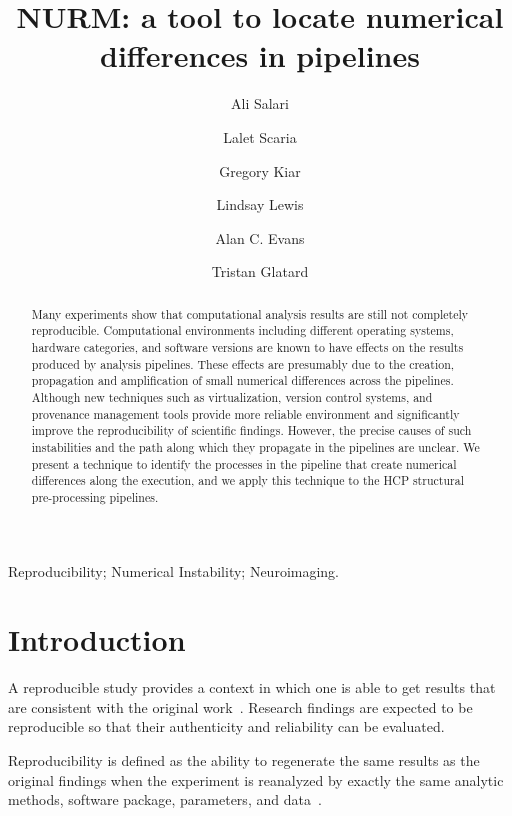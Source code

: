 \documentclass[a4paper,num-refs]{oup-contemporary}
\title{NURM: a tool to 
locate numerical differences in pipelines}
\begin{document}
\author[1]{Ali Salari}
\author[1]{Lalet Scaria}
\author[2,3]{Gregory Kiar}
\author[2]{Lindsay Lewis}
\author[2,3]{Alan C. Evans}
\author[1]{Tristan Glatard}


\maketitle

\begin{abstract} 

Many experiments show that computational analysis results are still not 
completely reproducible. Computational environments including different 
operating systems, hardware categories, and software versions are known 
to have effects on the results produced by analysis pipelines. These 
effects are presumably due to the creation, propagation and 
amplification of small numerical differences across the pipelines. 
Although new techniques such as virtualization, version control 
systems, and provenance management tools provide more reliable 
environment and significantly improve the reproducibility of scientific 
findings. However, the precise causes of such instabilities and the 
path along which they propagate in the pipelines are unclear.  We 
present a technique to identify the processes in the pipeline that 
create numerical differences along the execution, and we apply this 
technique to the HCP structural pre-processing pipelines.

\end{abstract}

\begin{keywords}
Reproducibility; Numerical Instability; Neuroimaging.
\end{keywords}

\section{Introduction}

A reproducible study provides a context in which one is able to get 
results that are consistent with the original 
work~\cite{plesser2018reproducibility}. Research findings are expected 
to be reproducible so that their authenticity and reliability can be 
evaluated. 

Reproducibility is defined as the ability to regenerate the same 
results as the original findings when the experiment is reanalyzed by 
exactly the same analytic methods, software package, parameters, and 
data~\cite{peng2011reproducible}. 
\end{document}
